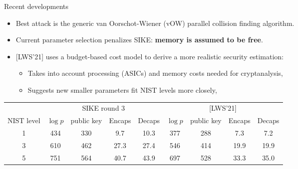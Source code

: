 \documentclass[aspectratio=169]{beamer}
\begin{document}
\begin{frame}{Recent developments}
  \vfill
  \begin{itemize}
  \item Best attack is the generic van Oorschot-Wiener (vOW) parallel
    collision finding algorithm.
  \item Current parameter selection penalizes SIKE: \textbf{memory is
      assumed to be free}.
  \item {[LWS'21]} uses a budget-based cost model to derive a more
    realistic security estimation:
    \begin{itemize}
    \item Takes into account processing (ASICs) and memory costs
      needed for cryptanalysis,
    \item Suggests new smaller parameters fit NIST levels more closely,
    \end{itemize}
  \end{itemize}

  \begin{center}
    \begin{tabular}{c | c c c c | c c c c }
      \hline
      & \multicolumn{4}{c|}{SIKE round 3} & \multicolumn{4}{c}{[LWS'21]} \\
      NIST level & $\log p$ & public key & Encaps & Decaps & $\log p$ & public key & Encaps & Decaps \\
      \hline\hline
      1 & 434 & 330 & 9.7 & 10.3 & 377 & 288 & 7.3 & 7.2\\
      3 & 610 & 462 & 27.3 & 27.4 & 546 & 414 & 19.9 & 19.9\\
      5 & 751 & 564 & 40.7 & 43.9 & 697 & 528 & 33.3 & 35.0\\
      \hline
    \end{tabular}
  \end{center}
  
\end{frame}

\end{document}
